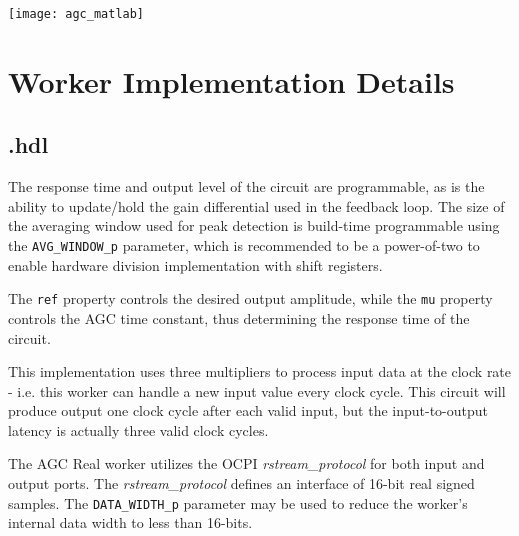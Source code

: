 	{\centering\captionsetup{type=figure}\texttt{[image: agc\_matlab]}\par{}\label{fig:ideal}}

\section*{Worker Implementation Details}
\subsection*{\comp.hdl}
\begin{flushleft}
	The response time and output level of the circuit are programmable, as is the ability to update/hold the gain differential used in the feedback loop. The size of the averaging window used for peak detection is build-time programmable using the \verb+AVG_WINDOW_p+ parameter, which is recommended to be a power-of-two to enable hardware division implementation with shift registers.\medskip

	The \verb+ref+ property controls the desired output amplitude, while the \verb+mu+ property controls the AGC time constant, thus determining the response time of the circuit.\medskip

	This implementation uses three multipliers to process input data at the clock rate - i.e. this worker can handle a new input value every clock cycle. This circuit will produce output one clock cycle after each valid input, but the input-to-output latency is actually three valid clock cycles.\medskip

	The AGC Real worker utilizes the OCPI \textit{rstream\_protocol} for both input and output ports. The \textit{rstream\_protocol} defines an interface of 16-bit real signed samples. The \verb+DATA_WIDTH_p+ parameter may be used to reduce the worker's internal data width to less than 16-bits.
\end{flushleft}

